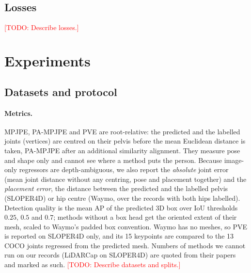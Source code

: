 \documentclass{egpubl}
\newcommand{\todo}[1]{\textcolor{red}{[TODO: #1]}}
\begin{document}
\subsection{Losses}
\todo{Describe losses.}

\section{Experiments}
\label{sec:experiments}

\subsection{Datasets and protocol}
\paragraph{Metrics.}
MPJPE, PA-MPJPE and PVE are root-relative: the predicted and the
labelled joints (vertices) are centred on their pelvis before the mean
Euclidean distance is taken, PA-MPJPE after an additional similarity
alignment. They measure pose and shape only and cannot see where a method
puts the person. Because image-only regressors are depth-ambiguous, we
also report the \emph{absolute} joint error (mean joint distance without
any centring, pose and placement together) and the \emph{placement
error}, the distance between the predicted and the labelled pelvis
(SLOPER4D) or hip centre (Waymo, over the records with both hips
labelled). Detection quality is the mean AP of the predicted 3D box over
IoU thresholds $0.25$, $0.5$ and $0.7$; methods without a box head get
the oriented extent of their mesh, scaled to Waymo's padded box
convention. Waymo has no meshes, so PVE is reported on SLOPER4D only, and
its 15 keypoints are compared to the 13 COCO joints regressed from the
predicted mesh. Numbers of methods we cannot run on our records
(LiDARCap on SLOPER4D) are quoted from their papers and marked as such.
\todo{Describe datasets and splits.}
\end{document}
